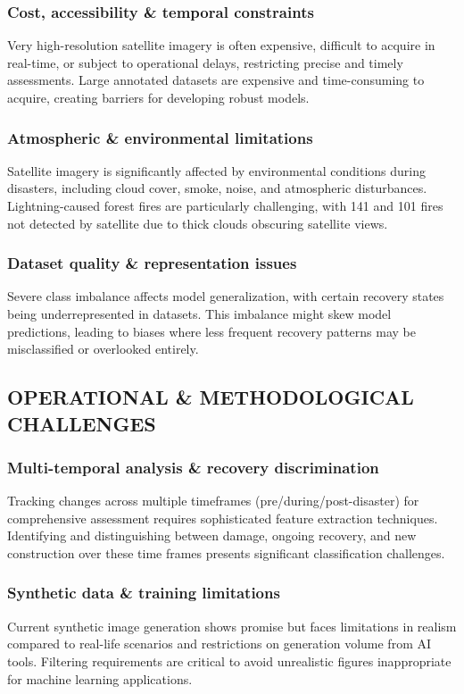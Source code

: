 \documentclass[conference,a4paper]{IEEEtran}
\begin{document}
\subsubsection{Cost, accessibility \& temporal constraints}
Very high-resolution satellite imagery is often expensive, difficult to acquire in real-time, or subject to operational delays, restricting precise and timely assessments. Large annotated datasets are expensive and time-consuming to acquire, creating barriers for developing robust models.
\subsubsection{Atmospheric \& environmental limitations}
Satellite imagery is significantly affected by environmental conditions during disasters, including cloud cover, smoke, noise, and atmospheric disturbances. Lightning-caused forest fires are particularly challenging, with 141 and 101 fires not detected by satellite due to thick clouds obscuring satellite views.
\subsubsection{Dataset quality \& representation issues}
Severe class imbalance affects model generalization, with certain recovery states being underrepresented in datasets. This imbalance might skew model predictions, leading to biases where less frequent recovery patterns may be misclassified or overlooked entirely.
\subsection{OPERATIONAL \& METHODOLOGICAL CHALLENGES}
\subsubsection{Multi-temporal analysis \& recovery discrimination}
Tracking changes across multiple timeframes (pre/during/post-disaster) for comprehensive assessment requires sophisticated feature extraction techniques. Identifying and distinguishing between damage, ongoing recovery, and new construction over these time frames presents significant classification challenges.
\subsubsection{Synthetic data \& training limitations}
Current synthetic image generation shows promise but faces limitations in realism compared to real-life scenarios and restrictions on generation volume from AI tools. Filtering requirements are critical to avoid unrealistic figures inappropriate for machine learning applications.
\end{document}
